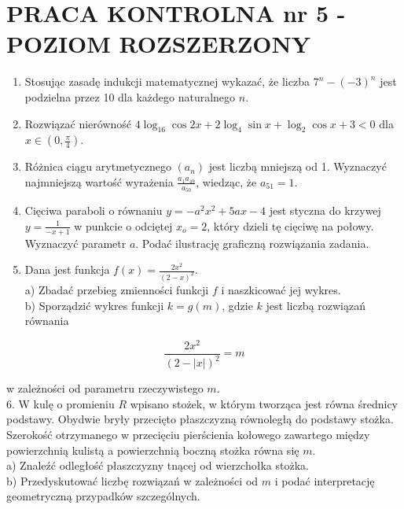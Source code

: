 \documentclass[10pt]{article}
\begin{document}
\section*{PRACA KONTROLNA nr 5 - POZIOM ROZSZERZONY}
\begin{enumerate}
  \item Stosując zasadę indukcji matematycznej wykazać, że liczba $7^{n}-(-3)^{n}$ jest podzielna przez 10 dla każdego naturalnego $n$.
  \item Rozwiązać nierówność $4 \log _{16} \cos 2 x+2 \log _{4} \sin x+\log _{2} \cos x+3<0$ dla $x \in\left(0, \frac{\pi}{4}\right)$.
  \item Różnica ciągu arytmetycznego $\left(a_{n}\right)$ jest liczbą mniejszą od 1. Wyznaczyć najmniejszą wartość wyrażenia $\frac{a_{1} a_{49}}{a_{50}}$, wiedząc, że $a_{51}=1$.
  \item Cięciwa paraboli o równaniu $y=-a^{2} x^{2}+5 a x-4$ jest styczna do krzywej $y=\frac{1}{-x+1}$ w punkcie o odciętej $x_{o}=2$, który dzieli tę cięciwę na połowy. Wyznaczyć parametr $a$. Podać ilustrację graficzną rozwiązania zadania.
  \item Dana jest funkcja $f(x)=\frac{2 x^{2}}{(2-x)^{2}}$.\\
a) Zbadać przebieg zmienności funkcji $f$ i naszkicować jej wykres.\\
b) Sporządzić wykres funkcji $k=g(m)$, gdzie $k$ jest liczbą rozwiązań równania
\end{enumerate}

$$
\frac{2 x^{2}}{(2-|x|)^{2}}=m
$$

w zależności od parametru rzeczywistego $m$.\\
6. W kulę o promieniu $R$ wpisano stożek, w którym tworząca jest równa średnicy podstawy. Obydwie bryły przecięto płaszczyzną równoległą do podstawy stożka. Szerokość otrzymanego w przecięciu pierścienia kołowego zawartego między powierzchnią kulistą a powierzchnią boczną stożka równa się $m$.\\
a) Znaleźć odległość płaszczyzny tnącej od wierzchołka stożka.\\
b) Przedyskutować liczbę rozwiązań w zależności od $m$ i podać interpretację geometryczną przypadków szczególnych.
\end{document}
